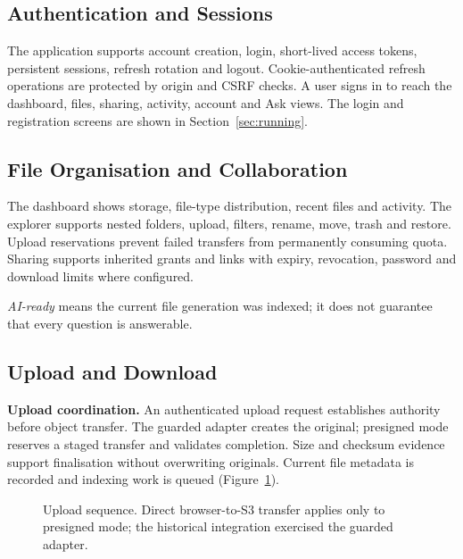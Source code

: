 \subsection{Authentication and Sessions}

The application supports account creation, login, short-lived access tokens, persistent sessions, refresh rotation and logout. Cookie-authenticated refresh operations are protected by origin and CSRF checks. A user signs in to reach the dashboard, files, sharing, activity, account and Ask views. The login and registration screens are shown in Section~\ref{sec:running}.

\subsection{File Organisation and Collaboration}

The dashboard shows storage, file-type distribution, recent files and activity. The explorer supports nested folders, upload, filters, rename, move, trash and restore. Upload reservations prevent failed transfers from permanently consuming quota. Sharing supports inherited grants and links with expiry, revocation, password and download limits where configured.

\emph{AI-ready} means the current file generation was indexed; it does not guarantee that every question is answerable.

\subsection{Upload and Download}

\textbf{Upload coordination.} An authenticated upload request establishes authority before object transfer. The guarded adapter creates the original; presigned mode reserves a staged transfer and validates completion. Size and checksum evidence support finalisation without overwriting originals. Current file metadata is recorded and indexing work is queued (Figure~\ref{fig:upseq}).

\begin{figure}[htbp]
\centering
{}
\caption{Upload sequence. Direct browser-to-S3 transfer applies only to presigned mode; the historical integration exercised the guarded adapter.}
\label{fig:upseq}
\end{figure}

